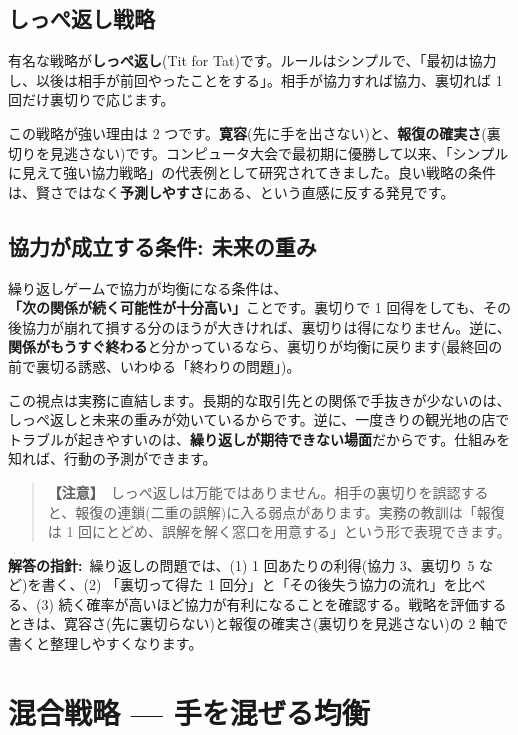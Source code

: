 \documentclass{article}
\begin{document}
\subsection{しっぺ返し戦略}

有名な戦略が\textbf{しっぺ返し}(Tit for Tat)です。ルールはシンプルで、「最初は協力し、以後は相手が前回やったことをする」。相手が協力すれば協力、裏切れば 1 回だけ裏切りで応じます。

この戦略が強い理由は 2 つです。\textbf{寛容}(先に手を出さない)と、\textbf{報復の確実さ}(裏切りを見逃さない)です。コンピュータ大会で最初期に優勝して以来、「シンプルに見えて強い協力戦略」の代表例として研究されてきました。良い戦略の条件は、賢さではなく\textbf{予測しやすさ}にある、という直感に反する発見です。

\subsection{協力が成立する条件: 未来の重み}

繰り返しゲームで協力が均衡になる条件は、\textbf{「次の関係が続く可能性が十分高い」}ことです。裏切りで 1 回得をしても、その後協力が崩れて損する分のほうが大きければ、裏切りは得になりません。逆に、\textbf{関係がもうすぐ終わる}と分かっているなら、裏切りが均衡に戻ります(最終回の前で裏切る誘惑、いわゆる「終わりの問題」)。

この視点は実務に直結します。長期的な取引先との関係で手抜きが少ないのは、しっぺ返しと未来の重みが効いているからです。逆に、一度きりの観光地の店でトラブルが起きやすいのは、\textbf{繰り返しが期待できない場面}だからです。仕組みを知れば、行動の予測ができます。

\begin{quote}
\textbf{【注意】}\ しっぺ返しは万能ではありません。相手の裏切りを誤認すると、報復の連鎖(二重の誤解)に入る弱点があります。実務の教訓は「報復は 1 回にとどめ、誤解を解く窓口を用意する」という形で表現できます。
\end{quote}

\textbf{解答の指針:}\ 繰り返しの問題では、(1) 1 回あたりの利得(協力 3、裏切り 5 など)を書く、(2) 「裏切って得た 1 回分」と「その後失う協力の流れ」を比べる、(3) 続く確率が高いほど協力が有利になることを確認する。戦略を評価するときは、寛容さ(先に裏切らない)と報復の確実さ(裏切りを見逃さない)の 2 軸で書くと整理しやすくなります。

\section{混合戦略 — 手を混ぜる均衡}
\end{document}
